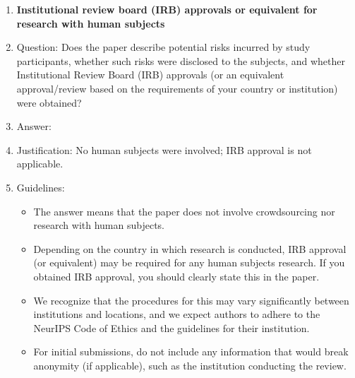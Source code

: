 \begin{enumerate}
\item {\bf Institutional review board (IRB) approvals or equivalent for research with human subjects}
    \item[] Question: Does the paper describe potential risks incurred by study participants, whether such risks were disclosed to the subjects, and whether Institutional Review Board (IRB) approvals (or an equivalent approval/review based on the requirements of your country or institution) were obtained?
    \item[] Answer: \answerNA{}
    \item[] Justification: No human subjects were involved; IRB approval is not applicable.
    \item[] Guidelines:
    \begin{itemize}
        \item The answer \answerNA{} means that the paper does not involve crowdsourcing nor research with human subjects.
        \item Depending on the country in which research is conducted, IRB approval (or equivalent) may be required for any human subjects research. If you obtained IRB approval, you should clearly state this in the paper.
        \item We recognize that the procedures for this may vary significantly between institutions and locations, and we expect authors to adhere to the NeurIPS Code of Ethics and the guidelines for their institution.
        \item For initial submissions, do not include any information that would break anonymity (if applicable), such as the institution conducting the review.
    \end{itemize}


\end{enumerate}
